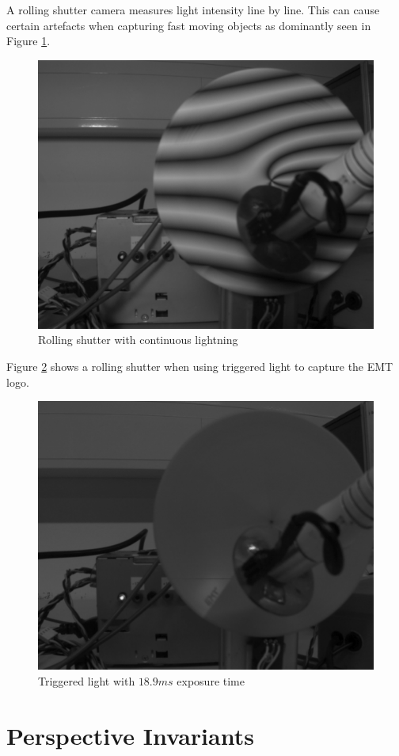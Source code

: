 \documentclass[
a4paper,     %
12pt         %
]{scrartcl}  %
\begin{document}
A rolling shutter camera measures light intensity line by line.
This can cause certain artefacts when capturing fast moving objects as dominantly seen in Figure \ref{fig:rolling_shuter_cont_light}.

\begin{figure}[H]
 \centering
 \includegraphics[width=.6\linewidth]{./Bildg_Messtechnik_Lab/SensorDynamics/rolling_shuter_cont_light.png}
 \caption{Rolling shutter with continuous lightning}
 \label{fig:rolling_shuter_cont_light}
\end{figure}

Figure \ref{fig:triggered_light_rolling_shutter} shows a rolling shutter when using triggered light to capture the EMT logo.

\begin{figure}[H]
 \centering
 \includegraphics[width=.6\linewidth]{./Bildg_Messtechnik_Lab/SensorDynamics/triggered_light_rolling_shutter.png}
 \caption{Triggered light with $18.9ms$ exposure time}
 \label{fig:triggered_light_rolling_shutter}
\end{figure}


\pagebreak
\section{Perspective Invariants}
\end{document}
